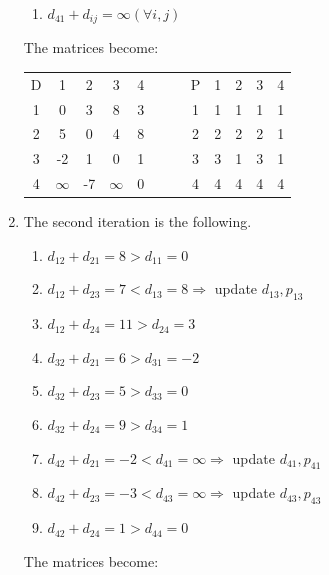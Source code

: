 \documentclass[12pt, a4paper]{report}
\begin{document}
\begin{enumerate}
\begin{enumerate}
                    \item $d_{41} + d_{ij} = \infty (\forall i, j)$
                \end{enumerate}
                The matrices become: 
                \begin{table}[H]
                    \centering
                    \begin{tabular}{c|cccccc|cccc}
                    D & 1        & 2  & 3        & 4 & $\:\:\:\:\:\:$ & P & 1 & 2 & 3 & 4 \\ \cline{1-5} \cline{7-11} 
                    1 & 0        & 3  & 8        & 3 &                & 1 & 1 & 1 & 1 & 1 \\
                    2 & 5        & 0  & 4        & 8 &                & 2 & 2 & 2 & 2 & 1 \\
                    3 & -2       & 1  & 0        & 1 &                & 3 & 3 & 1 & 3 & 1 \\
                    4 & $\infty$ & -7 & $\infty$ & 0 &                & 4 & 4 & 4 & 4 & 4
                    \end{tabular}
                \end{table}
            \item The second iteration is the following. 
                \begin{enumerate}
                    \item $d_{12} + d_{21} = 8 > d_{11} = 0$
                    \item $d_{12} + d_{23} = 7 < d_{13} = 8 \Rightarrow$ update $d_{13}, p_{13}$
                    \item $d_{12} + d_{24} = 11 > d_{24} = 3$
                    \item $d_{32} + d_{21} = 6 > d_{31} = -2$
                    \item $d_{32} + d_{23} = 5 > d_{33} = 0$
                    \item $d_{32} + d_{24} = 9 > d_{34} = 1$
                    \item $d_{42} + d_{21} = -2 < d_{41} = \infty \Rightarrow$ update $d_{41}, p_{41}$
                    \item $d_{42} + d_{23} = -3 < d_{43} = \infty \Rightarrow$ update $d_{43}, p_{43}$
                    \item $d_{42} + d_{24} = 1 > d_{44} = 0$
                \end{enumerate}
                The matrices become: 
                \begin{table}[H]
                    \centering

\end{table}
\end{enumerate}
\end{document}
